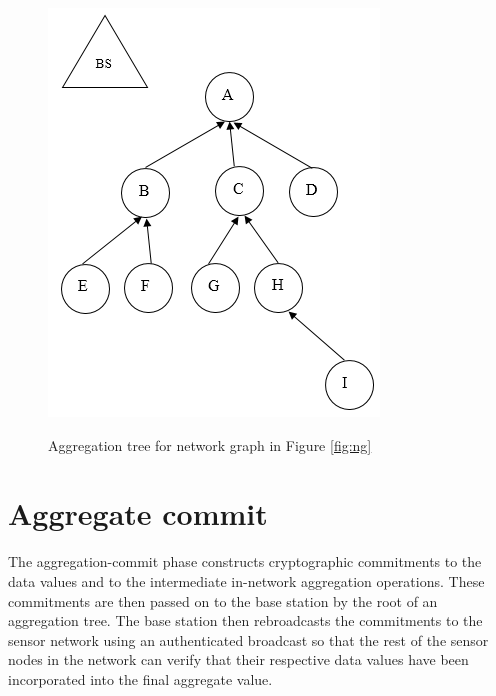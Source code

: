 		\begin{figure}[hp]
			\centering
			\includegraphics[scale = 1]{images/aggregation-tree.png}\\
			\caption{Aggregation tree for network graph in Figure \ref{fig:ng}}
			\label{fig:at}
		\end{figure}		

	\section{Aggregate commit} 
		\label{sub:aggregate_commit}
		The aggregation-commit phase constructs cryptographic commitments to the data values and to the intermediate in-network aggregation operations.
		These commitments are then passed on to the base station by the root of an aggregation tree.
		The base station then rebroadcasts the commitments to the sensor network using an authenticated broadcast so that the rest of the sensor nodes in the network can verify that their respective data values have been incorporated into the final aggregate value.

